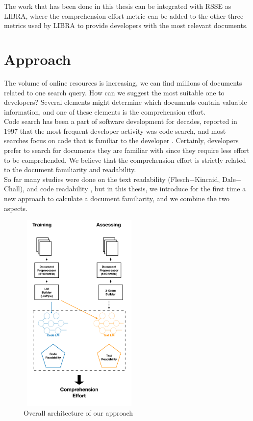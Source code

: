 \documentclass[12pt,mscthesis]{usiinfthesis}
\begin{document}
	The work that has been done in this thesis can be integrated with RSSE as LIBRA, where the comprehension effort metric can be added to the other three metrics used by LIBRA to provide developers with the most relevant documents.


\chapter{Approach}
	The volume of online resources is increasing, we can find millions of documents related to one search query. How can we suggest the most suitable one to developers? Several elements might determine which documents contain valuable information, and one of these elements is the comprehension effort.\\
	Code search has been a part of software development for decades, \citet{Singer-1997} reported in 1997 that the most frequent developer activity was code search, and most searches focus on code that is familiar to the developer \cite{Sadowski:2015}. Certainly, developers prefer to search for documents they are familiar with since they require less effort to be comprehended. We believe that the comprehension effort is strictly related to the document familiarity and readability.\\
    So far many studies were done on the text readability (Flesch$-$Kincaid, Dale$-$Chall), and code readability \cite{Buse:2010:LMC:1850489.1850615}, but in this thesis, we introduce for the first time a new approach to calculate a document familiarity, and we combine the two aspects.\\

	
	
	\begin{figure}[H]
	\centering
	\includegraphics[width=6cm, height=10cm]{overview}
	\caption{Overall architecture of our approach}
	\label{overview}
	\end{figure}
	
\end{document}
